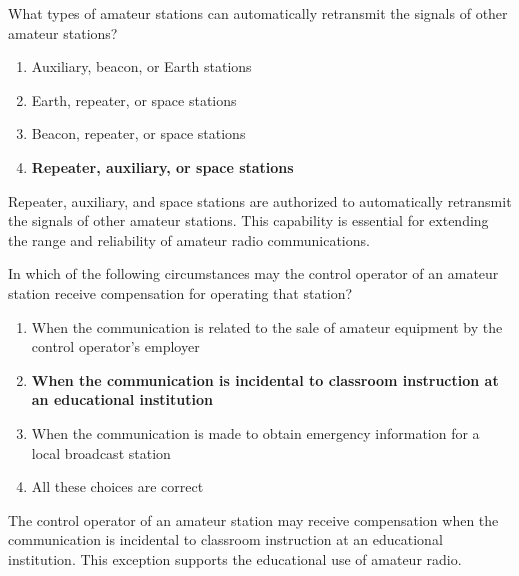 \begin{tcolorbox}[colback=gray!10!white,colframe=black!75!black,title={T1D07}]
What types of amateur stations can automatically retransmit the signals of other amateur stations?
\begin{enumerate}[label=\Alph*,noitemsep]
    \item Auxiliary, beacon, or Earth stations
    \item Earth, repeater, or space stations
    \item Beacon, repeater, or space stations
    \item \textbf{Repeater, auxiliary, or space stations}
\end{enumerate}
\end{tcolorbox}
Repeater, auxiliary, and space stations are authorized to automatically retransmit the signals of other amateur stations. This capability is essential for extending the range and reliability of amateur radio communications.


\begin{tcolorbox}[colback=gray!10!white,colframe=black!75!black,title={T1D08}]
In which of the following circumstances may the control operator of an amateur station receive compensation for operating that station?
\begin{enumerate}[label=\Alph*,noitemsep]
    \item When the communication is related to the sale of amateur equipment by the control operator's employer
    \item \textbf{When the communication is incidental to classroom instruction at an educational institution}
    \item When the communication is made to obtain emergency information for a local broadcast station
    \item All these choices are correct
\end{enumerate}
\end{tcolorbox}
The control operator of an amateur station may receive compensation when the communication is incidental to classroom instruction at an educational institution. This exception supports the educational use of amateur radio.


